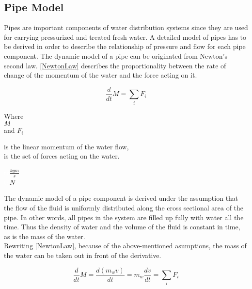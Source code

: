 \subsection{Pipe Model} 
\label{PipeModel}
Pipes are important components of water distribution systems since they are used for carrying pressurized and treated fresh water. A detailed model of pipes has to be derived in order to describe the relationship of pressure and flow for each pipe component.  
%
The dynamic model of a pipe can be originated from Newton's second law. \eqref{NewtonLaw} describes the proportionality between the rate of change of the momentum of the water and the force acting on it.

\begin{equation}
  \frac{d}{dt} M = \sum_i F_i
  \label{NewtonLaw}
\end{equation} 

\begin{minipage}[t]{0.20\textwidth}
Where\\
\hspace*{8mm} $M$ \\
and \hspace*{0.7mm}  $F_i$ 
\end{minipage}
\begin{minipage}[t]{0.68\textwidth}
\vspace*{2mm}
is the linear momentum of the water flow,\\
is the set of forces acting on the water.
\end{minipage}
\begin{minipage}[t]{0.10\textwidth}
\vspace*{2mm}
\textcolor{White}{te}$\unit{\frac{kgm}{s}}$\\
\textcolor{White}{te}$\unit{N}$
\end{minipage}

The dynamic model of a pipe component is derived under the assumption that the flow of the fluid is uniformly distributed along the cross sectional area of the pipe. In other words, all pipes in the system are filled up fully with water all the time. Thus the density of water and the volume of the fluid is constant in time, as is the mass of the water.
\\
Rewriting \eqref{NewtonLaw}, because of the above-mentioned asumptions, the mass of the water can be taken out in front of the derivative.

\begin{equation}
  \frac{d}{dt} M = {\frac{d(m_w v)}{dt}} = m_w \frac{dv}{dt} = \sum_i F_i
\end{equation} 

